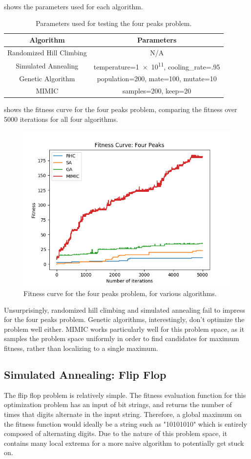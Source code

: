\documentclass{article}
\begin{document}
       shows the parameters used for each algorithm.

      \begin{table}[h!]
      \centering
        \begin{tabular}{||c|c||}\hline
          \textbf{Algorithm} & \textbf{Parameters} \\ \hline
          Randomized Hill Climbing & N/A \\ \hline
          Simulated Annealing & temperature=\num{1e11}, cooling\_rate=.95 \\ \hline
          Genetic Algorithm & population=200, mate=100, mutate=10 \\ \hline
          MIMIC & samples=200, keep=20 \\ \hline
        \end{tabular}

        \caption{Parameters used for testing the four peaks problem.}
        \label{tab:fp-params}
      \end{table}

       shows the fitness curve for the four peaks problem, comparing the fitness over 5000 iterations for all four algorithms.

      \begin{figure}[htb]
      \centering
      \includegraphics[width=.5\linewidth]{out/op/fourpeaks/fitness.png}
      \caption{Fitness curve for the four peaks problem, for various algorithms.}
      \label{fig:fitness-fp}
      \end{figure}

      Unsurprisingly, randomized hill climbing and simulated annealing fail to impress for the four peaks problem. Genetic algorithms, interestingly, don't optimize the problem well either. MIMIC works particularly well for this problem space, as it samples the problem space uniformly in order to find candidates for maximum fitness, rather than localizing to a single maximum.

    \subsection{Simulated Annealing: Flip Flop}
      The flip flop problem is relatively simple. The fitness evaluation function for this optimization problem has an input of bit strings, and returns the number of times that digits alternate in the input string. Therefore, a global maximum on the fitness function would ideally be a string such as "10101010" which is entirely composed of alternating digits. Due to the nature of this problem space, it contains many local extrema for a more naive algorithm to potentially get stuck on.
\end{document}
